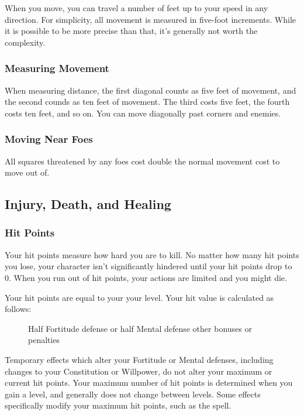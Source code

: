             When you move, you can travel a number of feet up to your speed in any direction.
            For simplicity, all movement is measured in five-foot increments.
            While it is possible to be more precise than that, it's generally not worth the complexity.

        \subsubsection{Measuring Movement}

             When measuring distance, the first diagonal counts as five feet of movement, and the second counds as ten feet of movement.
            The third costs five feet, the fourth costs ten feet, and so on.
            You can move diagonally past corners and enemies.

        \subsubsection{Moving Near Foes}\label{Moving Near Foes}
            All squares threatened by any foes cost double the normal movement cost to move out of.

    \subsection{Injury, Death, and Healing}\label{Injury, Death, and Healing}

        \subsubsection{Hit Points}\label{Hit Points}
            Your hit points measure how hard you are to kill.
            No matter how many hit points you lose, your character isn't significantly hindered until your hit points drop to 0.
            When you run out of hit points, your actions are limited and you might die.

            Your hit points are equal to your  \x your level.
            Your hit value is calculated as follows:

            \begin{figure}[h]
                \centering Half Fortitude defense or half Mental defense \add other bonuses or penalties
            \end{figure}

             Temporary effects which alter your Fortitude or Mental defenses, including changes to your Constitution or Willpower, do not alter your maximum or current hit points.
            Your maximum number of hit points is determined when you gain a level, and generally does not change between levels.
            Some effects specifically modify your maximum hit points, such as the  spell.

